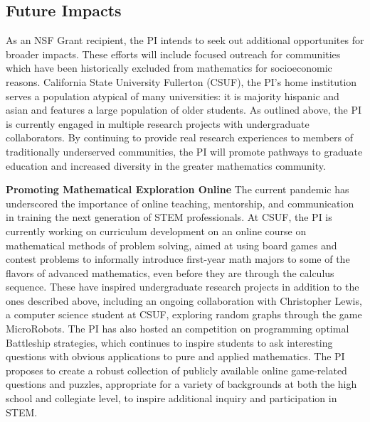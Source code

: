 \documentclass[11pt,letterpaper]{article}
\theoremstyle{definition}
\begin{document}
\subsection{Future Impacts}
As an NSF Grant recipient, the PI intends to seek out additional opportunites for broader impacts.
These efforts will include focused outreach for communities which have been historically excluded from mathematics for socioeconomic reasons.
California State University Fullerton (CSUF), the PI's home institution serves a population atypical of many universities: it is majority hispanic and asian and features a large population of older students.
As outlined above, the PI is currently engaged in multiple research projects with undergraduate collaborators.
By continuing to provide real research experiences to members of traditionally underserved communities, the PI will promote pathways to graduate education and increased diversity in the greater mathematics community.

\noindent\textbf{Promoting Mathematical Exploration Online}
The current pandemic has underscored the importance of online teaching, mentorship, and communication in training the next generation of STEM professionals.
At CSUF, the PI is currently working on curriculum development on an online course on mathematical methods of problem solving, aimed at using board games and contest problems to informally introduce first-year math majors to some of the flavors of advanced mathematics, even before they are through the calculus sequence.
These have inspired undergraduate research projects in addition to the ones described above, including an ongoing collaboration with Christopher Lewis, a computer science student at CSUF, exploring random graphs through the game MicroRobots.
The PI has also hosted an competition on programming optimal Battleship strategies, which continues to inspire students to ask interesting questions with obvious applications to pure and applied mathematics.
The PI proposes to create a robust collection of publicly available online game-related questions and puzzles, appropriate for a variety of backgrounds at both the high school and collegiate level, to inspire additional inquiry and participation in STEM.


\newpage

\nocite{*}
\setcounter{page}{1}

\end{document}
